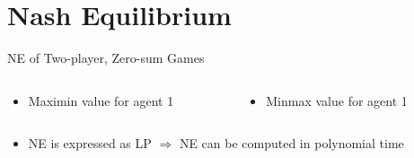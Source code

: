 \documentclass[11pt,aspectratio=169,handout]{beamer}
\begin{document}
 \section{Nash Equilibrium}
  \begin{frame}{NE of Two-player, Zero-sum Games}
   \begin{columns}
   \hspace{0.5em}
    \begin{column}{0.49\textwidth}
     \begin{itemize}
      \item<1-> Maximin value for agent 1
      \vspace{0.5em}
     \end{itemize}     
    \end{column}
    \begin{column}{0.49\textwidth}
     \begin{itemize}
      \item<3-> Minmax value for agent 1
      \vspace{0.5em}
     \end{itemize}
    \end{column}
   \end{columns}
   \begin{itemize}
    \item<5-> NE is expressed as \alert{LP} $\Rightarrow$ NE can be computed in \alert{polynomial time}
   \end{itemize}
  \end{frame}
  
\end{document}
